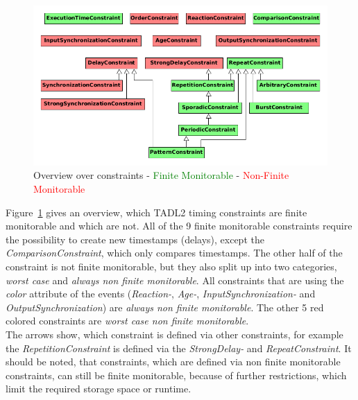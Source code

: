 \begin{figure}
	\centering
	\includegraphics[width=\linewidth]{relationBetweenConstraint}
	\caption{Overview over constraints - \textcolor{green}{Finite Monitorable} - \textcolor{red}{Non-Finite Monitorable}}
	\label{fig:relationbetweenconstraint}
\end{figure}

Figure~\ref{fig:relationbetweenconstraint} gives an overview, which TADL2 timing constraints are finite monitorable and which are not. All of the 9 finite monitorable constraints require the possibility to create new timestamps (delays), except the \emph{ComparisonConstraint}, which only compares timestamps. The other half of the constraint is not finite monitorable, but they also split up into two categories, \emph{worst case} and \emph{always non finite monitorable}. All constraints that are using the \emph{color} attribute of the events (\emph{Reaction-}, \emph{Age-}, \emph{InputSynchronization-} and \emph{OutputSynchronization}) are \emph{always non finite monitorable}. The other 5 red colored constraints are \emph{worst case non finite monitorable}.\\
The arrows show, which constraint is defined via other constraints, for example the \emph{RepetitionConstraint} is defined via the \emph{StrongDelay-} and \emph{RepeatConstraint}. It should be noted, that constraints, which are defined via non finite monitorable constraints, can still be finite monitorable, because of further restrictions, which limit the required storage space or runtime.

